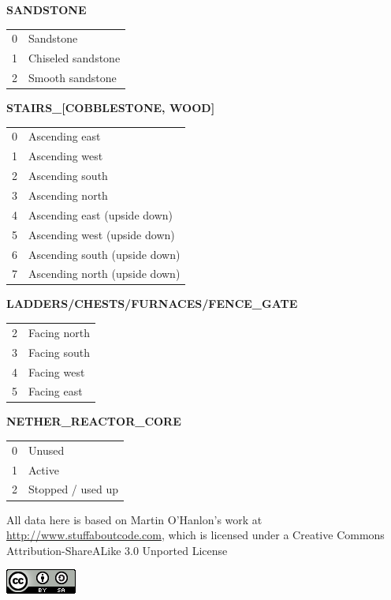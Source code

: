\documentclass[twocolumn]{geocraft-worksheet-multipage}
\begin{document}
\textbf{SANDSTONE}\vspace{-0.2cm}
\begin{center}
\begin{supertabular} { | r | l | }
0 & Sandstone \\
1 & Chiseled sandstone \\
2 & Smooth sandstone \\
\end{supertabular}
\end{center}

\textbf{STAIRS\_[COBBLESTONE, WOOD]}\vspace{-0.2cm}
\begin{center}
\begin{supertabular} { | r | l | }
0 & Ascending east \\
1 & Ascending west \\
2 & Ascending south \\
3 & Ascending north \\
4 & Ascending east (upside down) \\
5 & Ascending west (upside down) \\
6 & Ascending south (upside down) \\
7 & Ascending north (upside down) \\
\end{supertabular}
\end{center}

\textbf{LADDERS/CHESTS/FURNACES/FENCE\_GATE}\vspace{-0.2cm}
\begin{center}
\begin{supertabular} { | r | l | }
2 & Facing north \\
3 & Facing south \\
4 & Facing west \\
5 & Facing east \\
\end{supertabular}
\end{center}

\textbf{NETHER\_REACTOR\_CORE}\vspace{-0.2cm}
\begin{center}
\begin{supertabular} { | r | l | }
0 & Unused \\
1 & Active \\
2 & Stopped / used up \\
\end{supertabular}
\end{center}


All data here is based on Martin O'Hanlon's work at
{\textcolor{greenish} {\url{http://www.stuffaboutcode.com}}}, which is
licensed under a Creative Commons Attribution-ShareALike 3.0 Unported
License \vspace{0.2cm}
\begin{center}
\includegraphics[scale=0.8]{creativecommons}
\end{center}
\end{document}
